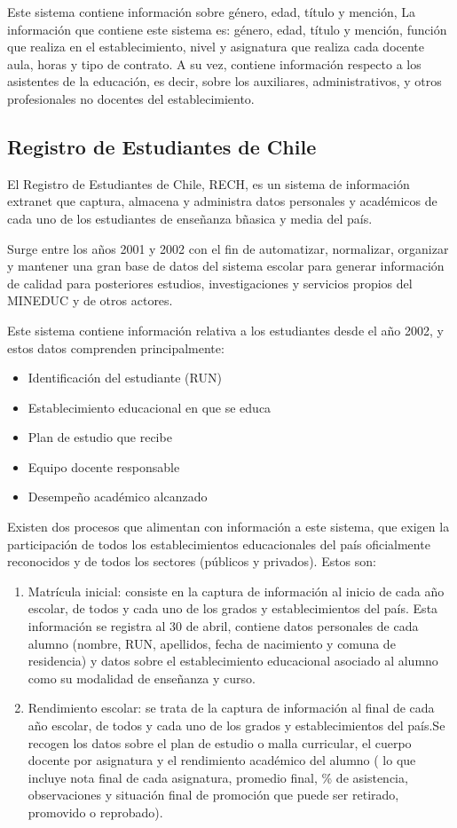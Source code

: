 Este sistema contiene información sobre género, edad, título y mención, 
La información que contiene este sistema es: género, edad, título y mención, función que realiza en el establecimiento, nivel y asignatura que realiza cada docente aula, horas y tipo de contrato. A su vez, contiene información respecto a los asistentes de la educación, es decir, sobre los auxiliares, administrativos, y otros profesionales no docentes del establecimiento. 

\subsection{Registro de Estudiantes de Chile}
El Registro de Estudiantes de Chile, RECH, es un sistema de información extranet que captura, almacena y administra datos personales y académicos de cada uno de los estudiantes de enseñanza bñasica y media del país. 

Surge entre los años 2001 y 2002 con el fin de automatizar, normalizar, organizar y mantener una gran base de datos del sistema escolar para generar información de calidad para posteriores estudios, investigaciones y servicios propios del MINEDUC y de otros actores.

Este sistema contiene información relativa a los estudiantes desde el año 2002, y estos datos comprenden principalmente: 
\begin{itemize}
\item Identificación del estudiante (RUN)
\item Establecimiento educacional en que se educa
\item Plan de estudio que recibe
\item Equipo docente responsable
\item Desempeño académico alcanzado
\end{itemize}

Existen dos procesos que alimentan con información a este sistema, que exigen la participación de todos los establecimientos educacionales del país oficialmente reconocidos y de todos los sectores (públicos y privados). Estos son:
\begin{enumerate}
\item Matrícula inicial: consiste en la captura de información al inicio de cada año escolar, de todos y cada uno de los grados y establecimientos del país. Esta información se registra al 30 de abril, contiene datos personales de cada alumno (nombre, RUN, apellidos, fecha de nacimiento y comuna de residencia) y datos sobre el establecimiento educacional asociado al alumno como su modalidad de enseñanza y curso.
\item Rendimiento escolar: se trata de la captura de información al final de cada año escolar, de todos y cada uno de los grados y establecimientos del país.Se recogen los datos sobre el plan de estudio o malla curricular, el cuerpo docente por asignatura y el rendimiento académico del alumno ( lo que incluye nota final de cada asignatura, promedio final, \% de asistencia, observaciones y situación final de promoción que puede ser retirado, promovido o reprobado).
\end{enumerate}

